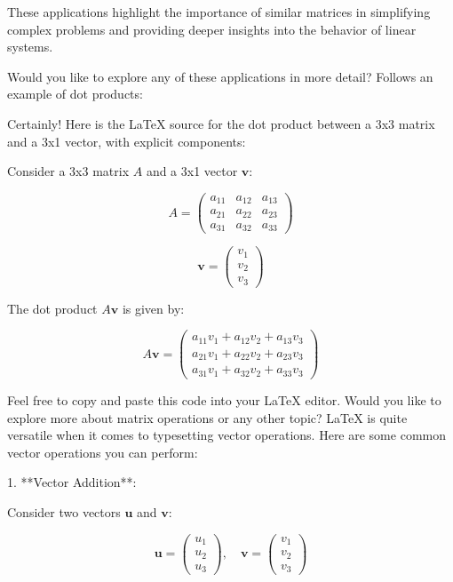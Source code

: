 \documentclass{article}
\begin{document}
These applications highlight the importance of similar matrices in simplifying complex problems and providing deeper insights into the behavior of linear systems.

Would you like to explore any of these applications in more detail?
Follows an example of dot products:

Certainly! Here is the LaTeX source for the dot product between a 3x3 matrix and a 3x1 vector, with explicit components:



Consider a 3x3 matrix \( A \) and a 3x1 vector \( \mathbf{v} \):

\[
A = \begin{pmatrix}
a_{11} & a_{12} & a_{13} \\
a_{21} & a_{22} & a_{23} \\
a_{31} & a_{32} & a_{33}
\end{pmatrix}
\]

\[
\mathbf{v} = \begin{pmatrix}
v_1 \\
v_2 \\
v_3
\end{pmatrix}
\]

The dot product \( A \mathbf{v} \) is given by:

\[
A \mathbf{v} = \begin{pmatrix}
a_{11}v_1 + a_{12}v_2 + a_{13}v_3 \\
a_{21}v_1 + a_{22}v_2 + a_{23}v_3 \\
a_{31}v_1 + a_{32}v_2 + a_{33}v_3
\end{pmatrix}
\]


 
Feel free to copy and paste this code into your LaTeX editor. Would you like to explore more about matrix operations or any other topic?
LaTeX is quite versatile when it comes to typesetting vector operations. Here are some common vector operations you can perform:

1. **Vector Addition**:
   
   Consider two vectors \( \mathbf{u} \) and \( \mathbf{v} \):

   \[
   \mathbf{u} = \begin{pmatrix}
   u_1 \\
   u_2 \\
   u_3
   \end{pmatrix}, \quad
   \mathbf{v} = \begin{pmatrix}
   v_1 \\
   v_2 \\
   v_3
   \end{pmatrix}
   \]
\end{document}
